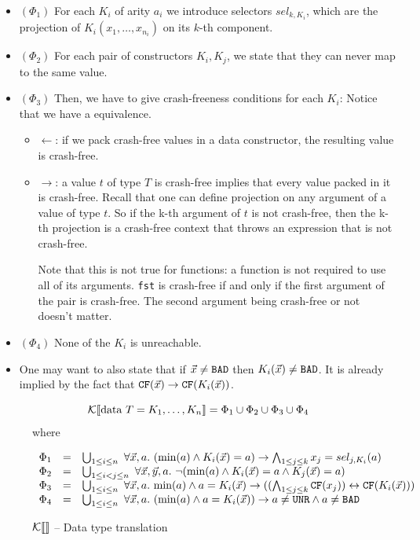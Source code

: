 \documentclass[preprint]{sigplanconf}
\begin{document}
\begin{itemize}
\item $(\Phi_1)$ For each $K_i$ of arity $a_i$ we introduce selectors
  $sel_{k,K_i}$, which are the projection of $K_i(x_1,\dots,x_{n_i})$
  on its $k$-th component.
\item $(\Phi_2)$ For each pair of constructors $K_i,K_j$, we state that they can
  never map to the same value.
\item $(\Phi_3)$ Then, we have to give crash-freeness conditions for each $K_i$:
  Notice that we have a equivalence.
  \begin{itemize}
  \item $\leftarrow$: if we pack crash-free values in a data
    constructor, the resulting value is crash-free.
  \item $\rightarrow$: a value $t$ of type $T$ is crash-free implies
    that every value packed in it is crash-free. Recall that one can
    define projection on any argument of a value of type $t$. So if
    the k-th argument of $t$ is not crash-free, then the k-th
    projection is a crash-free context that throws an expression that
    is not crash-free.

  Note that this is not true for functions: a function is not required
  to use all of its arguments. \texttt{fst} is crash-free if and only
  if the first argument of the pair is crash-free. The second argument
  being crash-free or not doesn't matter.
  \end{itemize}

\item $(\Phi_4)$ None of the $K_i$ is unreachable.
\item One may want to also state that if $\vec{x} \neq \texttt{BAD}$ then
  $K_i(\vec{x}) \neq \texttt{BAD}$. It is already implied by the fact that
  $\texttt{CF}(\vec{x}) \to \texttt{CF}(K_i(\vec{x}))$.
\end{itemize}

\begin{figure}
 $$\mathcal{K} \llbracket \mbox{data } T = K_1, \dots, K_n \rrbracket = \Phi_1 \cup \Phi_2 \cup \Phi_3 \cup \Phi_4$$
 \hspace{5.6cm}where
  \begin{center}
    \[  \begin{array}{rcl}
      \Phi_1 &=& \bigcup_{1 \leq i \leq n}~\forall \vec{x},a.~(\mbox{min}(a) \land K_i(\vec{x}) = a) \to \bigwedge_{1 \leq j \leq k} x_j = sel_{j,K_i}(a) \\
      \Phi_2 &=& \bigcup_{1 \leq i < j \leq n}~\forall \vec{x},\vec{y},a.~ \lnot (\mbox{min}(a) \land K_i(\vec{x}) = a \land K_j(\vec{x}) = a) \\
      \Phi_3 &=& \bigcup_{1 \leq i \leq n}~\forall \vec{x},a.~\mbox{min}(a) \land a = K_i(\vec{x}) \to ((\bigwedge_{1 \leq j \leq k} \texttt{CF}(x_j)) \leftrightarrow \texttt{CF}(K_i(\vec{x}))) \\
      \Phi_4 &=& \bigcup_{1 \leq i \leq n}~\forall \vec{x},a.~(\mbox{min}(a) \land a = K_i(\vec{x})) \to a \neq \texttt{UNR} \land a \neq \texttt{BAD} 
    \end{array} \]
  \end{center}
  \caption{$\mathcal{K} \llbracket  \rrbracket$ -- Data type translation}
  \label{ktrans}
\end{figure}
\end{document}
